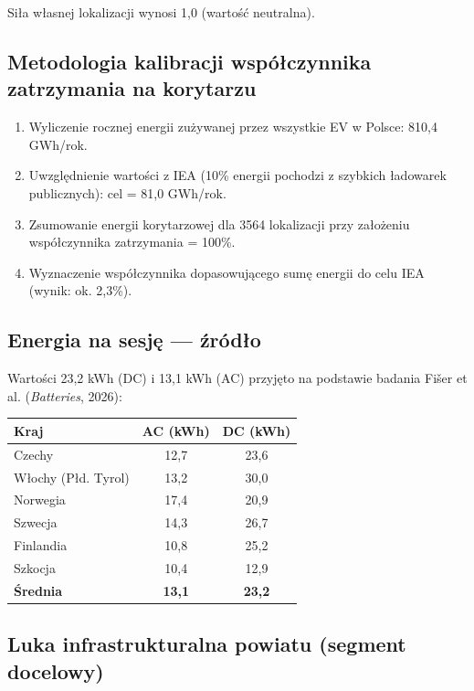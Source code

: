 \documentclass[11pt,a4paper]{article}
\begin{document}
	Siła własnej lokalizacji wynosi 1,0 (wartość neutralna).
	
	\subsection{Metodologia kalibracji współczynnika zatrzymania na korytarzu}
	
	\begin{enumerate}
		\item Wyliczenie rocznej energii zużywanej przez wszystkie EV w Polsce: 810,4 GWh/rok.
		\item Uwzględnienie wartości z IEA (10\% energii pochodzi z szybkich ładowarek publicznych): cel = 81,0 GWh/rok.
		\item Zsumowanie energii korytarzowej dla 3564 lokalizacji przy założeniu współczynnika zatrzymania = 100\%.
		\item Wyznaczenie współczynnika dopasowującego sumę energii do celu IEA (wynik: ok. 2,3\%).
	\end{enumerate}
	
	\subsection{Energia na sesję --- źródło}
	
	Wartości 23,2 kWh (DC) i 13,1 kWh (AC) przyjęto na podstawie badania Fišer et al. (\emph{Batteries}, 2026):
	
	\begin{center}
		\begin{tabular}{lcc}
			\toprule
			\textbf{Kraj} & \textbf{AC (kWh)} & \textbf{DC (kWh)} \\
			\midrule
			Czechy & 12,7 & 23,6 \\
			Włochy (Płd. Tyrol) & 13,2 & 30,0 \\
			Norwegia & 17,4 & 20,9 \\
			Szwecja & 14,3 & 26,7 \\
			Finlandia & 10,8 & 25,2 \\
			Szkocja & 10,4 & 12,9 \\
			\midrule
			\textbf{Średnia} & \textbf{13,1} & \textbf{23,2} \\
			\bottomrule
		\end{tabular}
	\end{center}
	
	\subsection{Luka infrastrukturalna powiatu (segment docelowy)}
	
\end{document}
